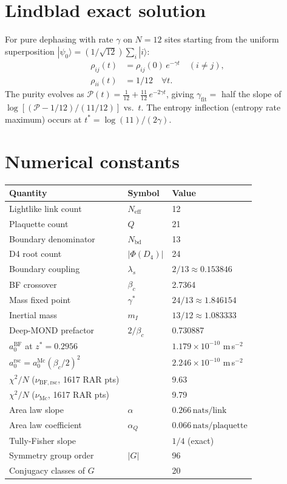 \documentclass[12pt,a4paper]{article}
\theoremstyle{plain}
\theoremstyle{definition}
\newcommand{\lams}{\lambda_s}
\newcommand{\gstar}{\gamma^{*}}
\newcommand{\Neff}{N_{\mathrm{eff}}}
\newcommand{\Nbd}{N_{\mathrm{bd}}}
\newcommand{\betac}{\beta_c}
\newcommand{\nuBFrsc}{\nu_{\mathrm{BF,rsc}}}
\newcommand{\nuMc}{\nu_{\mathrm{Mc}}}
\begin{document}
\section{Lindblad exact solution}
\label{app:lindblad}

For pure dephasing with rate $\gamma$ on $N=12$ sites starting from
the uniform superposition $|\psi_0\rangle = (1/\sqrt{12})\sum_i |i\rangle$:
\begin{align}
  \rho_{ij}(t) &= \rho_{ij}(0)\, e^{-\gamma t}
  \quad (i \neq j), \\
  \rho_{ii}(t) &= 1/12 \quad \forall t.
\end{align}
The purity evolves as
$\mathcal{P}(t) = \frac{1}{12} + \frac{11}{12}\,e^{-2\gamma t}$,
giving $\gamma_{\mathrm{fit}} = $ half the slope of $\log[(\mathcal{P}-1/12)/(11/12)]$
vs.\ $t$.  The entropy inflection (entropy rate maximum) occurs at
$t^* = \log(11)/(2\gamma)$.

\section{Numerical constants}
\label{app:constants}

\begin{center}
\begin{tabular}{lll}
\toprule
Quantity & Symbol & Value \\
\midrule
Lightlike link count & $\Neff$ & 12 \\
Plaquette count & $Q$ & 21 \\
Boundary denominator & $\Nbd$ & 13 \\
D4 root count & $|\Phi(D_4)|$ & 24 \\
Boundary coupling & $\lams$ & $2/13 \approx 0.153846$ \\
BF crossover & $\betac$ & 2.7364 \\
Mass fixed point & $\gstar$ & $24/13 \approx 1.846154$ \\
Inertial mass & $m_I$ & $13/12 \approx 1.083333$ \\
Deep-MOND prefactor & $2/\betac$ & 0.730887 \\
$a_0^{\mathrm{BF}}$ at $z^*=0.2956$ & & $1.179\times10^{-10}$ m\,s$^{-2}$ \\
$a_0^{\mathrm{rsc}} = a_0^{\mathrm{Mc}}(\betac/2)^2$ & & $2.246\times10^{-10}$ m\,s$^{-2}$ \\
$\chi^2/N$ ($\nuBFrsc$, 1617 RAR pts) & & 9.63 \\
$\chi^2/N$ ($\nuMc$, 1617 RAR pts) & & 9.79 \\
Area law slope & $\alpha$ & $0.266\,\mathrm{nats/link}$ \\
Area law coefficient & $\alpha_Q$ & $0.066\,\mathrm{nats/plaquette}$ \\
Tully-Fisher slope & & $1/4$ (exact) \\
Symmetry group order & $|G|$ & 96 \\
Conjugacy classes of $G$ & & 20 \\
\bottomrule
\end{tabular}
\end{center}
\end{document}
